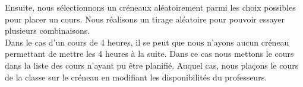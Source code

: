 Ensuite, nous sélectionnons un créneaux aléatoirement parmi les choix possibles pour placer un cours. Nous réalisons un tirage aléatoire pour pouvoir essayer plusieurs combinaisons.\\

Dans le cas d'un cours de 4 heures, il se peut que nous n'ayons aucun créneau permettant de mettre les 4 heures à la suite. Dans ce cas nous mettons le cours dans la liste des cours n'ayant pu être planifié. 
Auquel cas, nous plaçons le cours de la classe sur le créneau en modifiant les disponibilités du professeurs. 


